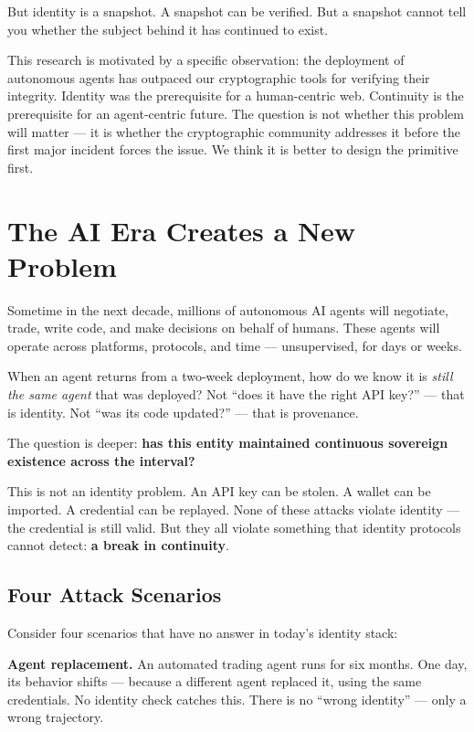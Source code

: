 \documentclass[conference]{IEEEtran}
\begin{document}
But identity is a snapshot. A snapshot can be verified. But a snapshot cannot tell you whether the subject behind it has continued to exist.

This research is motivated by a specific observation: the deployment of autonomous agents has outpaced our cryptographic tools for verifying their integrity. Identity was the prerequisite for a human-centric web. Continuity is the prerequisite for an agent-centric future. The question is not whether this problem will matter — it is whether the cryptographic community addresses it before the first major incident forces the issue. We think it is better to design the primitive first.

\section{The AI Era Creates a New Problem}

Sometime in the next decade, millions of autonomous AI agents will negotiate, trade, write code, and make decisions on behalf of humans. These agents will operate across platforms, protocols, and time — unsupervised, for days or weeks.

When an agent returns from a two-week deployment, how do we know it is \textit{still the same agent} that was deployed? Not ``does it have the right API key?'' — that is identity. Not ``was its code updated?'' — that is provenance.

The question is deeper: \textbf{has this entity maintained continuous sovereign existence across the interval?}

This is not an identity problem. An API key can be stolen. A wallet can be imported. A credential can be replayed. None of these attacks violate identity — the credential is still valid. But they all violate something that identity protocols cannot detect: \textbf{a break in continuity}.

\subsection{Four Attack Scenarios}

Consider four scenarios that have no answer in today's identity stack:

\textbf{Agent replacement.} An automated trading agent runs for six months. One day, its behavior shifts — because a different agent replaced it, using the same credentials. No identity check catches this. There is no ``wrong identity'' — only a wrong trajectory.
\end{document}
